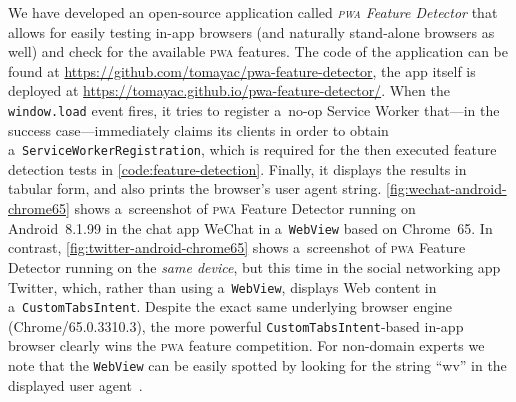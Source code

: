 \documentclass[sigconf]{acmart}
\begin{document}
We have developed an open-source application called \emph{\textsc{pwa} Feature Detector}
that allows for easily testing in-app browsers (and naturally stand-alone browsers as well)
and check for the available \textsc{pwa} features.
The code of the application can be found at
\url{https://github.com/tomayac/pwa-feature-detector},
the app itself is deployed at \url{https://tomayac.github.io/pwa-feature-detector/}.
When the \texttt{window.load} event fires,
it tries to register a~no-op Service Worker
that---in the success case---immediately claims its clients
in order to obtain a~\texttt{ServiceWorkerRegistration},
which is required for the then executed feature detection tests
in \autoref{code:feature-detection}.
Finally, it displays the results in tabular form,
and also prints the browser's user agent string.
\autoref{fig:wechat-android-chrome65} shows a~screenshot of \textsc{pwa} Feature Detector
running on Android~8.1.99 in the chat app WeChat in a~\texttt{WebView} based on Chrome~65.
In contrast, \autoref{fig:twitter-android-chrome65} shows
a~screenshot of \textsc{pwa} Feature Detector
running on the \emph{same device}, but this time in the social networking app Twitter,
which, rather than using a~\texttt{WebView},
displays Web content in a~\texttt{CustomTabsIntent}.
Despite the exact same underlying browser engine (Chrome/65.0.3310.3),
the more powerful \texttt{CustomTabsIntent}-based in-app browser
clearly wins the \textsc{pwa} feature competition.
For non-domain experts we note that the \texttt{WebView}
can be easily spotted by looking for the string
``wv'' in the displayed user agent~\cite{chrome2018useragent}.
\end{document}
